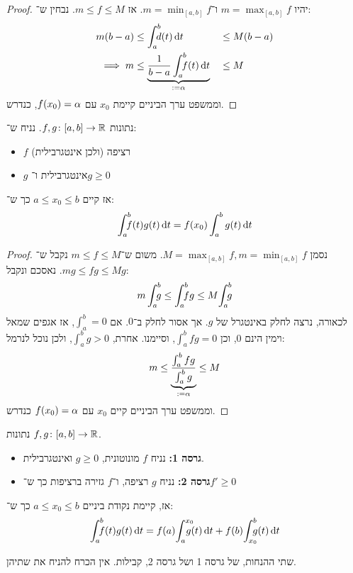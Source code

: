 \documentclass[]{../../../../tex/classes/styledArticle}
\begin{document}
	\begin{proof}
		יהיו $m = \max_{[a, b]} f$ ו־$m = \min_{[a, b]} f$. אז $m \le f \le M$. נבחין ש־: 
		\begin{alignat*}{9}
			m(b - a) &\le \int^{b}_a \dequad \ d(t) \dt &&\le M(b - a) \\
			\implies m &\le \underbrace{\frac{1}{b - a} \int^{b}_a \dequad \ f(t) \dt}_{:= \ag} &&\le M
		\end{alignat*}
		וממשפט ערך הביניים קיימת $x_0$ עם $f(x_0) = \alpha$, כנדרש. 
	\end{proof}
	
	\begin{Theorem}
		נתונות $f, g \colon [a, b] \to \mathbb{R}$. נניח ש־: 
		\begin{itemize}
			\item $f$ רציפה (ולכן אינטגרבילית)
			\item $g$ אינטגרבילית ו־$g \ge 0$
		\end{itemize}
		אז קיים $a \le x_0 \le b$ כך ש־: 
		\[ \int^b_a \!\!\!\!\!\! \ f(t)g(t) \,\mathrm{d}t = f(x_0)\int^{b}_a g(t) \,\mathrm{d}t \]
	\end{Theorem}
	\begin{proof}
		נסמן $M = \max_{[a, b]} f, m = \min_{[a, b]} f$. משום ש־$m \le f \le M$ נקבל ש־$mg \le fg \le Mg$. נאסכם ונקבל: 
		\[ m\int^{b}_a \dequad \ g \le \int^{b}_a \dequad \ fg \le M\! \int^{b}_a \dequad \ g \]
		לכאורה, נרצה לחלק באינטגרל של $g$. אך אסור לחלק ב־$0$. אם $\int^b_a = 0$, אז אגפים שמאל וימין הינם $0$, וכן $\int^b_a fg = 0$, וסיימנו. אחרת, $\int^b_a g > 0$, ולכן נוכל לנרמל: 
		\[ m \le \underbrace{\frac{\int^b_a fg}{\int^b_a g}}_{:= \alpha} \le M \]
		וממשפט ערך הביניים קיים $x_0$ עם $f(x_0) = \alpha$ כנדרש. 
	\end{proof}
	
	\begin{Lemma}נתונות $f, g \colon [a, b] \to \mathbb{R}$. 
		\begin{itemize}
			\item \textbf{גרסה 1: }נניח $f$ מונוטונית, $g \ge 0$ ואינטגרבילית. 
			\item \textbf{גרסה 2: }נניח $g$ רציפה, ו־$f$ גזירה ברציפות כך ש־$f' \ge 0$
		\end{itemize}
		אז, קיימת נקודת ביניים $a \le x_0 \le b$ כך ש־: 
		\[ \int^b_a \dequad \ f(t)g(t) \dt = f(a)\! \int^{x_0}_a \dequad g(t) \dt + f(b)\! \int^{b}_{x_0}\dequad \ g(t) \dt \]
	\end{Lemma}
	שתי ההנחות, של גרסה 1 ושל גרסה 2, קבילות. אין הכרח להניח את שתיהן. 
	
	
	
	
	\ndoc
\end{document}
